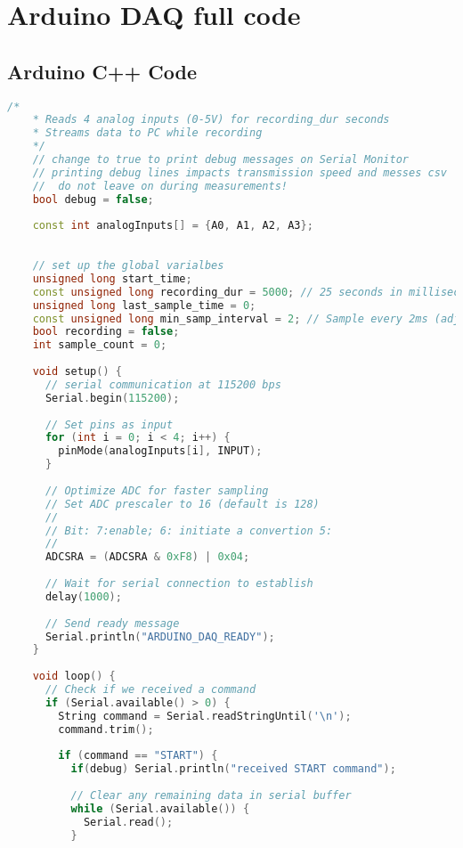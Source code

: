 \section{Arduino DAQ full code}
\subsection{Arduino C++ Code}
\label{subsec:arduinoCppcode}
\begin{lstlisting}[style=cstyle, caption=C++ Code on Arduino, label=lst:arduinoCodeApp, language=C++]
    /*
    * Reads 4 analog inputs (0-5V) for recording_dur seconds
    * Streams data to PC while recording
    */
    // change to true to print debug messages on Serial Monitor
    // printing debug lines impacts transmission speed and messes csv
    //  do not leave on during measurements!
    bool debug = false;
  
    const int analogInputs[] = {A0, A1, A2, A3};
    
    
    // set up the global varialbes
    unsigned long start_time;
    const unsigned long recording_dur = 5000; // 25 seconds in milliseconds (ENSURE python code is greater than this)
    unsigned long last_sample_time = 0;
    const unsigned long min_samp_interval = 2; // Sample every 2ms (adjust for stability)
    bool recording = false;
    int sample_count = 0;
    
    void setup() {
      // serial communication at 115200 bps
      Serial.begin(115200);
      
      // Set pins as input
      for (int i = 0; i < 4; i++) {
        pinMode(analogInputs[i], INPUT);
      }
      
      // Optimize ADC for faster sampling
      // Set ADC prescaler to 16 (default is 128)
      //
      // Bit: 7:enable; 6: initiate a convertion 5: 
      //
      ADCSRA = (ADCSRA & 0xF8) | 0x04;
      
      // Wait for serial connection to establish
      delay(1000);
      
      // Send ready message
      Serial.println("ARDUINO_DAQ_READY");
    }
    
    void loop() {
      // Check if we received a command
      if (Serial.available() > 0) {
        String command = Serial.readStringUntil('\n');
        command.trim();
        
        if (command == "START") {
          if(debug) Serial.println("received START command");
  
          // Clear any remaining data in serial buffer
          while (Serial.available()) {
            Serial.read();
          }
          

\end{lstlisting}
